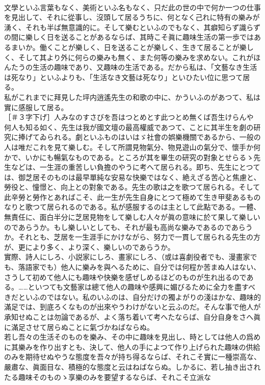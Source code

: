 \documentclass[8pt]{extreport}
\begin{document}
\begin{CJK}{UTF8}{min}
\\	文學といふ言葉もなく、美術といふ名もなく、只だ此の世の中で何か一つの仕事を見出して、それに從事し、沒頭して居るうちに、何となく己れに特有の樂みが湧く、それも半ば無意識的に。そして樂むといふのでもなく、其癖知らず識らずの間に樂しく日を送ることがあるならば、其時こそ眞に趣味生活の第一歩ではあるまいか。働くことが樂しく、日を送ることが樂しく、生きて居ることが樂しく、そして其より外に何らの樂みも無く、また何等の樂みを求めない。これがほんたうの生活の趣味であり、又趣味の生活である。だから私は、「文藝なき生活は死なり」といふよりも、「生活なき文藝は死なり」といひたい位に思つて居る。
\\	私がこれまでに拜見した坪内逍遙先生の和歌の中に、かういふのがあつて、私は實に感服して居る。
\\	［＃３字下げ］人みなのすさびを吾はつとめとす此つとめ無くば吾生けらんや
\\	何人も知る如く、先生は我が國文壇の最高權威であつて、ことに其半生を劇の研究に捧げてゐられる。劇といふものはいはゞ社會の娯樂機關であるから、一般の人は唯だこれを見て樂しむ。そして所謂見物氣分、物見遊山の氣分で、懷手か何かで、いかにも暢氣なものである。ところが其を畢生の研究の對象とせらるゝ先生などは、一生涯の重苦しい負擔のやうに考へて居られる。即ち、先生にとつては、御芝居そのものは最早單純な安易な快樂ではなく、絶えざる苦心と焦慮と、勞役と、憧憬と、向上との對象である。先生の歌は之を歌つて居られる。そして此辛勞と勞作とあればこそ、此一生が先生自身にとつて極めて生き甲斐あるものなりと歌つて居られるのである。私が感服するのは主として此點である。一體、無責任に、面白半分に芝居見物をして樂しむ人々が眞の意味に於て果して樂しいのであらうか。もし樂しいとしても、それが最も高尚な樂みであるのであらうか。それとも、芝居を一生涯手にかけながら、努力で一貫して居られる先生の方が、更により多く、より深く、樂しいのであらうか。
\\	實際、詩人にしろ、小説家にしろ、畫家にしろ、（或は喜劇役者でも、漫畫家でも、落語家でも）他人に樂みを與へるために、自分では何程か苦まぬ人はない、さうして初めて他人にも趣味や快樂を感ぜしめるほどのものが生れ出るのである。……といつても文藝家は總て他人の趣味や感興に媚びるために全力を盡すべきだといふのではない。私のいふのは、自分だけの獨よがりの淺はかな、趣味的滿足では、到底ろくなものが出來やうわけがないと云ふのだ。そんな事で他人が承知せぬことは勿論であるが、よく落ち着いて考へたならば、自分自身をさへ眞に滿足させて居らぬことに氣づかねばならぬ。
\\	若し吾々の生活そのものを樂み、その中に趣味を見出し、時としては他人の爲めに其樂みを作り出すとも、決して、他人の手によつて作り上げられた趣味の供給のみを期待せぬやうな態度を吾々が持ち得るならば、それこそ實に一種崇高な、嚴肅な、眞面目な、積極的な態度と云はねばならぬ。しかるに、若し抽き出されたる趣味そのものゝ享樂のみを要望するならば、それこそ立派な 

\end{CJK}
\end{document}
